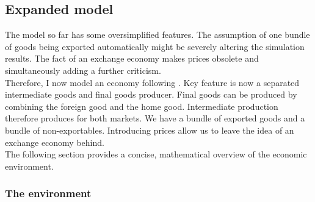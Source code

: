 \documentclass{article}
\begin{document}
\subsection{Expanded model}

The model so far has some oversimplified features. The assumption of one bundle of goods being exported automatically might be severely altering the simulation results. The fact of an exchange economy makes prices obsolete and simultaneously adding a further criticism.\\
Therefore, I now model an economy following \cite{backus1992international}. Key feature is now a separated intermediate goods and final goods producer. Final goods can be produced by combining the foreign good and the home good. Intermediate production therefore produces for both markets. We have a bundle of exported goods and a bundle of non-exportables. Introducing prices allow us to leave the idea of an exchange economy behind. \\
The following section provides a concise, mathematical overview of the economic environment.

\subsubsection{The environment}
\end{document}
